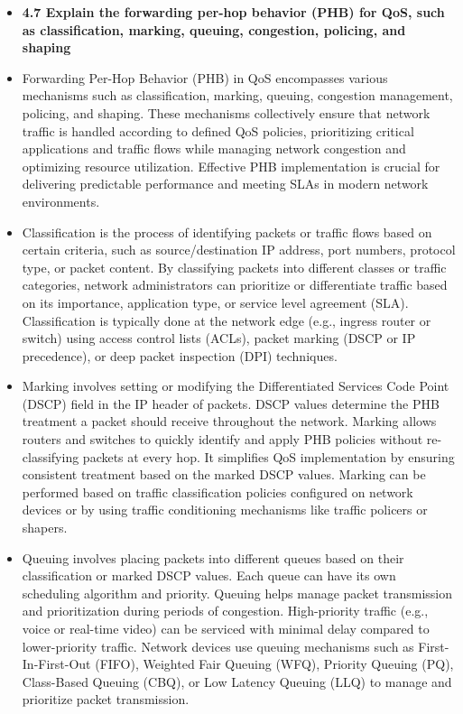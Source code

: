 \documentclass{article}
\begin{document}
\begin{itemize}
  \item \textbf{4.7 Explain the forwarding per-hop behavior (PHB) for QoS, such as classification, marking, queuing, congestion, policing, and shaping}
  	\item[] Forwarding Per-Hop Behavior (PHB) in QoS encompasses various mechanisms such as classification, marking, queuing, congestion management, policing, and shaping. These mechanisms collectively ensure that network traffic is handled according to defined QoS policies, prioritizing critical applications and traffic flows while managing network congestion and optimizing resource utilization. Effective PHB implementation is crucial for delivering predictable performance and meeting SLAs in modern network environments.
	\item[] Classification is the process of identifying packets or traffic flows based on certain criteria, such as source/destination IP address, port numbers, protocol type, or packet content. By classifying packets into different classes or traffic categories, network administrators can prioritize or differentiate traffic based on its importance, application type, or service level agreement (SLA). Classification is typically done at the network edge (e.g., ingress router or switch) using access control lists (ACLs), packet marking (DSCP or IP precedence), or deep packet inspection (DPI) techniques.
	\item[] Marking involves setting or modifying the Differentiated Services Code Point (DSCP) field in the IP header of packets. DSCP values determine the PHB treatment a packet should receive throughout the network. Marking allows routers and switches to quickly identify and apply PHB policies without re-classifying packets at every hop. It simplifies QoS implementation by ensuring consistent treatment based on the marked DSCP values. Marking can be performed based on traffic classification policies configured on network devices or by using traffic conditioning mechanisms like traffic policers or shapers.
	\item[] Queuing involves placing packets into different queues based on their classification or marked DSCP values. Each queue can have its own scheduling algorithm and priority. Queuing helps manage packet transmission and prioritization during periods of congestion. High-priority traffic (e.g., voice or real-time video) can be serviced with minimal delay compared to lower-priority traffic. Network devices use queuing mechanisms such as First-In-First-Out (FIFO), Weighted Fair Queuing (WFQ), Priority Queuing (PQ), Class-Based Queuing (CBQ), or Low Latency Queuing (LLQ) to manage and prioritize packet transmission.

\end{itemize}
\end{document}
